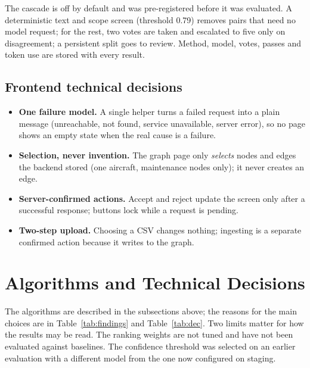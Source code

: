 The cascade is off by default and was pre-registered before it was evaluated. A deterministic text and scope screen (threshold 0.79) removes pairs that need no model request; for the rest, two votes are taken and escalated to five only on disagreement; a persistent split goes to review. Method, model, votes, passes and token use are stored with every result.

\subsection{Frontend technical decisions}
\begin{itemize}
\item \textbf{One failure model.} A single helper turns a failed request into a plain message (unreachable, not found, service unavailable, server error), so no page shows an empty state when the real cause is a failure.
\item \textbf{Selection, never invention.} The graph page only \emph{selects} nodes and edges the backend stored (one aircraft, maintenance nodes only); it never creates an edge.
\item \textbf{Server-confirmed actions.} Accept and reject update the screen only after a successful response; buttons lock while a request is pending.
\item \textbf{Two-step upload.} Choosing a CSV changes nothing; ingesting is a separate confirmed action because it writes to the graph.
\end{itemize}

\section{Algorithms and Technical Decisions}
The algorithms are described in the subsections above; the reasons for the main choices are in Table~\ref{tab:findings} and Table~\ref{tab:dec}. Two limits matter for how the results may be read. The ranking weights are not tuned and have not been evaluated against baselines. The confidence threshold was selected on an earlier evaluation with a different model from the one now configured on staging.

